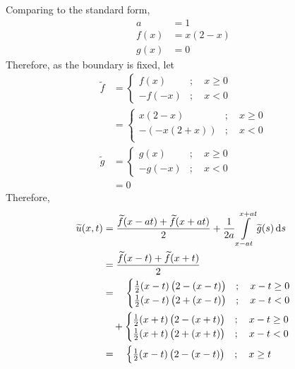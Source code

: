 \documentclass[titlepage, fleqn, a4paper, 12pt, twoside]{article}
\theoremstyle{definition}
\theoremstyle{theorem}
\renewcommand{\tilde}{\widetilde}
\begin{document}
\begin{solution}
	Comparing to the standard form,
	\begin{align*}
		a &= 1\\
		f(x) &= x (2 - x)\\
		g(x) &= 0
	\end{align*}
	Therefore, as the boundary is fixed, let
	\begin{align*}
		\tilde{f} &=
			\begin{cases}
				f(x) &;\quad x \ge 0\\
				-f(-x) &;\quad x < 0
			\end{cases}\\
		&=
			\begin{cases}
				x (2 - x) &;\quad x \ge 0\\
				- \left( -x (2 + x) \right) &;\quad x < 0\\
			\end{cases}\\
		\tilde{g} &=
			\begin{cases}
				g(x) &;\quad x \ge 0\\
				-g(-x) &;\quad x < 0
			\end{cases}\\
		&= 0
	\end{align*}
	Therefore,
	\begin{align*}
		\tilde{u}(x,t) &= \frac{\tilde{f}(x - a t) + \tilde{f}(x + a t)}{2} + \frac{1}{2 a} \int\limits_{x - a t}^{x + a t} \tilde{g}(s) \dif s\\
		&= \frac{\tilde{f}(x - t) + \tilde{f}(x + t)}{2}\\
		&= \quad
			\begin{cases}
				\frac{1}{2} (x - t) \left( 2 - (x - t) \right) &;\quad x - t \ge 0\\
				\frac{1}{2} (x - t) \left( 2 + (x - t) \right) &;\quad x - t < 0\\
			\end{cases}\\
		&\quad +
			\begin{cases}
				\frac{1}{2} (x + t) \left( 2 - (x + t) \right) &;\quad x - t \ge 0\\
				\frac{1}{2} (x + t) \left( 2 + (x + t) \right) &;\quad x - t < 0\\
			\end{cases}\\
		&= \quad
			\begin{cases}
				\frac{1}{2} (x - t) \left( 2 - (x - t) \right) &;\quad x \ge t\\

\end{cases}
\end{align*}
\end{solution}
\end{document}
